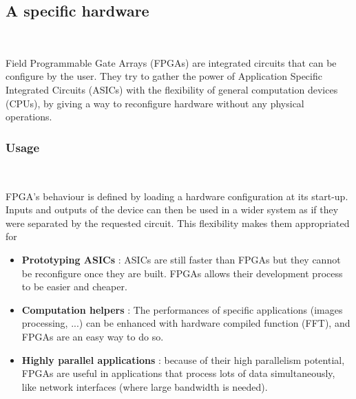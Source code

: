\documentclass[10pt,a4paper]{article}
\renewcommand{\indent}{~\\\vspace{-.8cm}}
\begin{document}
\subsection{A specific hardware} \indent

Field Programmable Gate Arrays (FPGAs) are integrated circuits that can be configure by the user.
They try to gather the power of Application Specific Integrated Circuits (ASICs) with the flexibility of general computation devices (CPUs), by giving a way to reconfigure hardware without any physical operations.

\subsubsection{Usage}
\indent

FPGA's behaviour is defined by loading a hardware configuration at its start-up. Inputs and outputs of the device can then be used in a wider system as if they were separated by the requested circuit. This flexibility makes them appropriated for

\begin{itemize}
	\item \textbf{Prototyping ASICs} : ASICs are still faster than FPGAs but they cannot be reconfigure once they are built. FPGAs allows their development process to be easier and cheaper.
	\item \textbf{Computation helpers} : The performances of specific applications (images processing, ...) can be enhanced with hardware compiled function (FFT), and FPGAs are an easy way to do so.
	\item \textbf{Highly parallel applications} : because of their high parallelism potential, FPGAs are useful in applications that process lots of data simultaneously, like network interfaces (where large bandwidth is needed).
\end{itemize}
\end{document}
